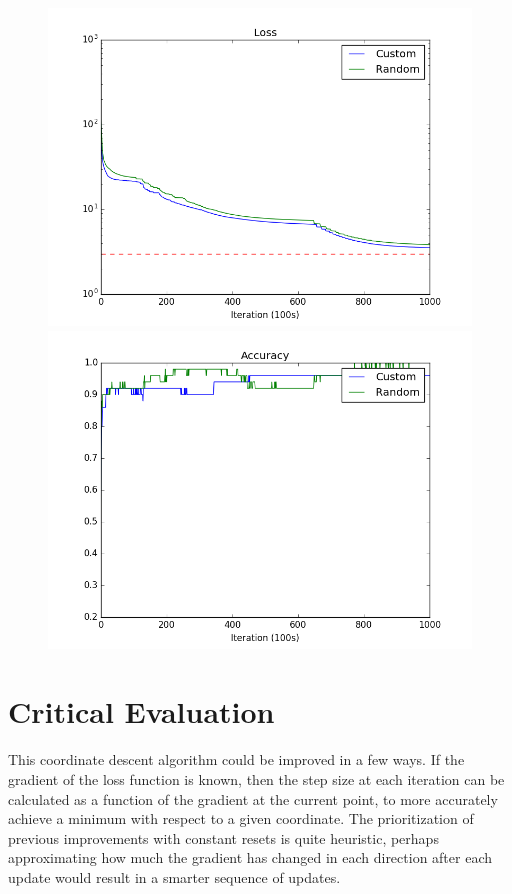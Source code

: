 \documentclass[letterpaper,10pt,onecolumn]{IEEEconf}
\begin{document}
\begin{figure}[h]
\begin{minipage}{.5\textwidth}
\centering
\includegraphics[width=\linewidth]{loss.png}
\end{minipage}
\begin{minipage}{.5\textwidth}
\centering
\includegraphics[width=\linewidth]{accuracy.png}
\end{minipage}
\end{figure}


\section{Critical Evaluation}

This coordinate descent algorithm could be improved in a few ways. If the gradient of the loss function is known, then the step size at each iteration can be calculated as a function of the gradient at the current point, to more accurately achieve a minimum with respect to a given coordinate. The prioritization of previous improvements with constant resets is quite heuristic, perhaps approximating how much the gradient has changed in each direction after each update would result in a smarter sequence of updates.
\end{document}
